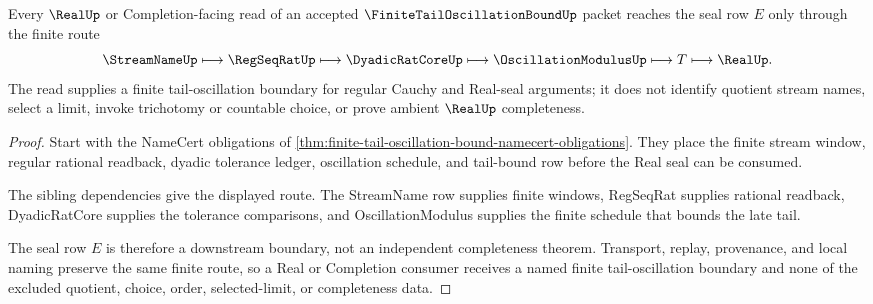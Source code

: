 \begin{theorem}
\label{thm:finite-tail-oscillation-bound-real-route}
Every $\RealUp$ or Completion-facing read of an accepted $\FiniteTailOscillationBoundUp$ packet reaches the seal row $E$ only through the finite route
$$
\StreamNameUp \longmapsto \RegSeqRatUp \longmapsto \DyadicRatCoreUp \longmapsto \OscillationModulusUp \longmapsto T \longmapsto \RealUp .
$$
The read supplies a finite tail-oscillation boundary for regular Cauchy and Real-seal arguments; it does not identify quotient stream names, select a limit, invoke trichotomy or countable choice, or prove ambient $\RealUp$ completeness.
\end{theorem}
\begin{proof}
Start with the NameCert obligations of \autoref{thm:finite-tail-oscillation-bound-namecert-obligations}. They place the finite stream window, regular rational readback, dyadic tolerance ledger, oscillation schedule, and tail-bound row before the Real seal can be consumed.

The sibling dependencies give the displayed route. The StreamName row supplies finite windows, RegSeqRat supplies rational readback, DyadicRatCore supplies the tolerance comparisons, and OscillationModulus supplies the finite schedule that bounds the late tail.

The seal row $E$ is therefore a downstream boundary, not an independent completeness theorem. Transport, replay, provenance, and local naming preserve the same finite route, so a Real or Completion consumer receives a named finite tail-oscillation boundary and none of the excluded quotient, choice, order, selected-limit, or completeness data.
\end{proof}

